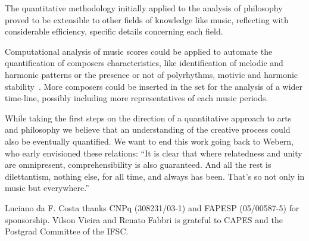 \documentclass[
 aip,
 jmp,
 amsmath,amssymb,
 reprint,
]{revtex4-1}
\begin{document}
The quantitative methodology initially applied to the analysis of philosophy~\cite{Fabbri}
proved to be extensible to other fields of knowledge like
music, reflecting with considerable efficiency, specific details
concerning each field. 

Computational analysis of music scores could be
applied to automate the quantification of composers characteristics, like
identification of melodic and harmonic patterns or the presence or not of
polyrhythms, motivic and harmonic stability~\cite{Correa}. More composers could be
inserted in the set for the analysis of a wider time-line, possibly
including more representatives of each music periods. 

While taking the first
steps on the direction of a quantitative approach to arts and philosophy
we believe that an understanding of the creative process could also
be eventually quantified. We want to end this work going back to Webern,
who early envisioned these relations: ``It is clear that where relatedness and unity are omnipresent,
comprehensibility is also guaranteed. And all the rest is
dilettantism, nothing else, for all time, and always has been. That's
so not only in music but everywhere.''

\begin{acknowledgments}
Luciano da F. Costa thanks CNPq (308231/03-1) and FAPESP (05/00587-5)
for sponsorship. Vilson Vieira and Renato Fabbri is grateful to CAPES and 
the Postgrad Committee of the IFSC.
\end{acknowledgments}

\nocite{*}

\end{document}
